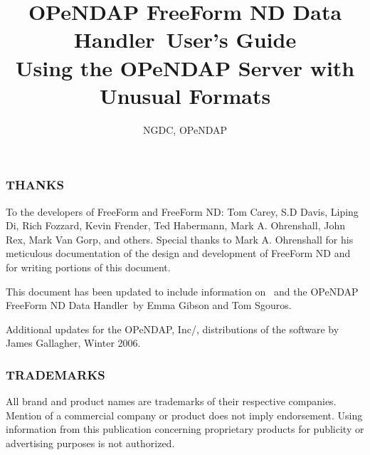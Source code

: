 \documentclass{dods-book}
\newcommand{\DOCversion}{Version \rcsInfoRevision}
\newcommand{\ffs}{OPeNDAP FreeForm ND Data Handler}
\begin{document}
\title{\ffs\ User's Guide\\Using the OPeNDAP Server with Unusual Formats}
\author{NGDC, OPeNDAP}
\date{\rcsInfoDate}
\maketitle

\W{}

\W

\subsubsection{THANKS}

To the developers of FreeForm and FreeForm ND: Tom Carey, S.D Davis,
Liping Di, Rich Fozzard, Kevin Frender, Ted Habermann, Mark A.
Ohrenshall, John Rex, Mark Van Gorp, and others. Special thanks to
Mark A. Ohrenshall for his meticulous documentation of the design and
development of FreeForm ND and for writing portions of this document.

This document has been updated to include information on \ffnd\ 
and the \ffs\ by Emma Gibson and Tom Sgouros.

Additional updates for the OPeNDAP, Inc/, distributions of the
software by James Gallagher, Winter 2006.

\subsubsection{TRADEMARKS}

All brand and product names are trademarks of their respective
companies. Mention of a commercial company or product does not imply
endorsement. Using information from this publication concerning
proprietary products for publicity or advertising purposes is not
authorized.

\T

\tableofcontents
\listoffigures
\listoftables

\clearemptydoublepage



\end{document}
